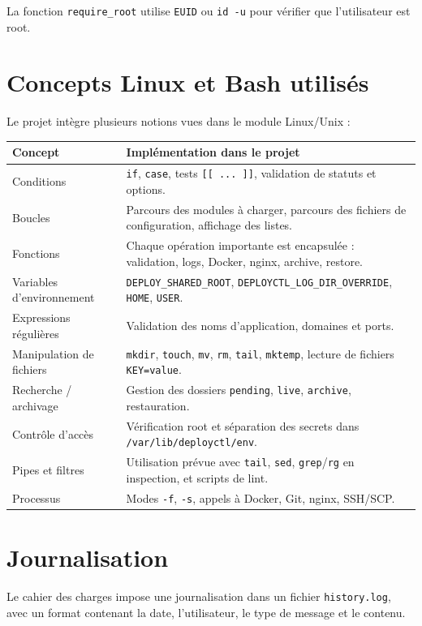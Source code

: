 \documentclass[12pt,a4paper]{article}
\begin{document}
La fonction \texttt{require\_root} utilise \texttt{EUID} ou \texttt{id -u} pour vérifier que l'utilisateur est root.

\section{Concepts Linux et Bash utilisés}

Le projet intègre plusieurs notions vues dans le module Linux/Unix :

\begin{longtable}{p{}p{}}
\toprule
\textbf{Concept} & \textbf{Implémentation dans le projet} \\
\midrule
Conditions & \texttt{if}, \texttt{case}, tests \texttt{[[ ... ]]}, validation de statuts et options. \\
Boucles & Parcours des modules à charger, parcours des fichiers de configuration, affichage des listes. \\
Fonctions & Chaque opération importante est encapsulée : validation, logs, Docker, nginx, archive, restore. \\
Variables d'environnement & \texttt{DEPLOY\_SHARED\_ROOT}, \texttt{DEPLOYCTL\_LOG\_DIR\_OVERRIDE}, \texttt{HOME}, \texttt{USER}. \\
Expressions régulières & Validation des noms d'application, domaines et ports. \\
Manipulation de fichiers & \texttt{mkdir}, \texttt{touch}, \texttt{mv}, \texttt{rm}, \texttt{tail}, \texttt{mktemp}, lecture de fichiers \texttt{KEY=value}. \\
Recherche / archivage & Gestion des dossiers \texttt{pending}, \texttt{live}, \texttt{archive}, restauration. \\
Contrôle d'accès & Vérification root et séparation des secrets dans \texttt{/var/lib/deployctl/env}. \\
Pipes et filtres & Utilisation prévue avec \texttt{tail}, \texttt{sed}, \texttt{grep}/\texttt{rg} en inspection, et scripts de lint. \\
Processus & Modes \texttt{-f}, \texttt{-s}, appels à Docker, Git, nginx, SSH/SCP. \\
\bottomrule
\end{longtable}

\section{Journalisation}

Le cahier des charges impose une journalisation dans un fichier \texttt{history.log}, avec un format contenant la date, l'utilisateur, le type de message et le contenu.
\end{document}
